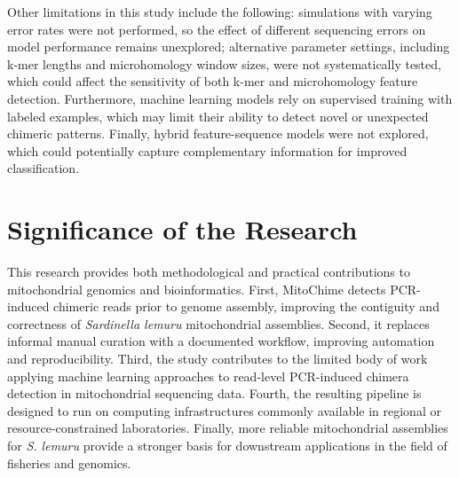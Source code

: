 Other limitations in this study include the following: simulations with varying error rates were not performed, so the effect of different sequencing errors on model performance remains unexplored; alternative parameter settings, including k-mer lengths and microhomology window sizes, were not systematically tested, which could affect the sensitivity of both k-mer and microhomology feature detection. Furthermore, machine learning models rely on supervised training with labeled examples, which may limit their ability to detect novel or unexpected chimeric patterns. Finally, hybrid feature-sequence models were not explored, which could potentially capture complementary information for improved classification.

\section{Significance of the Research}
\label{sec:significance}

This research provides both methodological and practical contributions to mitochondrial genomics and bioinformatics. First, MitoChime detects PCR-induced chimeric reads prior to genome assembly, improving the contiguity and correctness of \textit{Sardinella lemuru} mitochondrial assemblies. Second, it replaces informal manual curation with a documented workflow, improving automation and reproducibility. Third, the study contributes to the limited body of work applying machine learning approaches to read-level PCR-induced chimera detection in mitochondrial sequencing data. Fourth, the resulting pipeline is designed to run on computing infrastructures commonly available in regional or resource-constrained laboratories. Finally, more reliable mitochondrial assemblies for \textit{S. lemuru} provide a stronger basis for downstream applications in the field of fisheries and genomics.